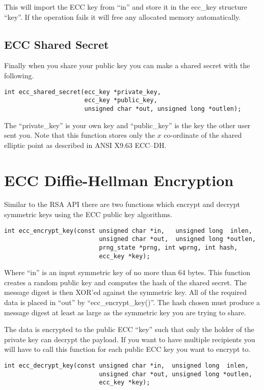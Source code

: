 \documentclass[a4paper]{book}
\begin{document}
This will import the ECC key from ``in'' and store it in the ecc\_key structure ``key''.  If the operation fails it will free
any allocated memory automatically.

\subsection{ECC Shared Secret}
Finally when you share your public key you can make a shared secret with the following.
\begin{verbatim}
int ecc_shared_secret(ecc_key *private_key, 
                      ecc_key *public_key, 
                      unsigned char *out, unsigned long *outlen);
\end{verbatim}
The ``private\_key'' is your own key and ``public\_key'' is the key the other user sent you.   Note that this function stores only the 
$x$ co-ordinate of the shared elliptic point as described in ANSI X9.63 ECC--DH.  

\section{ECC Diffie-Hellman Encryption}
Similar to the RSA API there are two functions which encrypt and decrypt symmetric keys using the ECC public key
algorithms.

\begin{verbatim}
int ecc_encrypt_key(const unsigned char *in,   unsigned long  inlen,
                          unsigned char *out,  unsigned long *outlen, 
                          prng_state *prng, int wprng, int hash, 
                          ecc_key *key);
\end{verbatim}

Where ``in'' is an input symmetric key of no more than 64 bytes.  This function creates a random public key
and computes the hash of the shared secret.  The message digest is then XOR'ed against the symmetric key.  All of the required
data is placed in ``out'' by ``ecc\_encrypt\_key()''.   The hash chosen must produce a message digest at least as large
as the symmetric key you are trying to share.

The data is encrypted to the public ECC ``key'' such that only the holder of the private key can decrypt the payload.  If you want
to have multiple recipients you will have to call this function for each public ECC key you want to encrypt to.


\begin{verbatim}
int ecc_decrypt_key(const unsigned char *in,  unsigned long  inlen,
                          unsigned char *out, unsigned long *outlen, 
                          ecc_key *key);
\end{verbatim}
\end{document}
